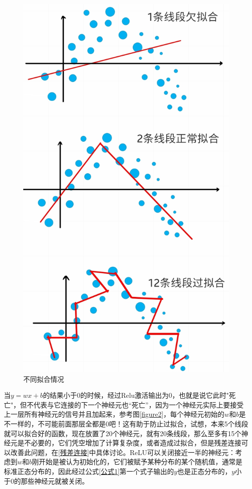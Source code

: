 \documentclass[a5paper, 11pt]{ctexbook}
\begin{document}
\begin{figure}
    \begin{center}
        \includegraphics[scale=0.18]{figures/拟合情况.jpg}
        \caption{不同拟合情况}
        \label{拟合}
    \end{center}
\end{figure}



当$y=wx+b$的结果小于0的时候，经过Relu激活输出为0，也就是说它此时"死亡"，但不代表与它连接的下一个神经元也“死亡”，因为一个神经元实际上要接受上一层所有神经元的信号并且加起来，参考图\ref{figure2}，每个神经元初始的$w$和$b$是不一样的，不可能前面那层全都是0吧！这有助于防止过拟合，试想，本来5个线段就可以拟合好的函数，现在放置了20个神经元，就有20条线段，那么至多有15个神经元是不必要的，它们凭空增加了计算复杂度，或者造成过拟合，但是残差连接可以改善此问题，在\ref{残差连接}中具体讨论。ReLU可以关闭接近一半的神经元：考虑到$w$和$b$刚开始是被认为初始化的，它们被赋予某种分布的某个随机值，通常是标准正态分布的，因此经过公式\ref{公式1}第一个式子输出的$y$也是正态分布的，$y$小于0的那些神经元就被关闭。
\end{document}
